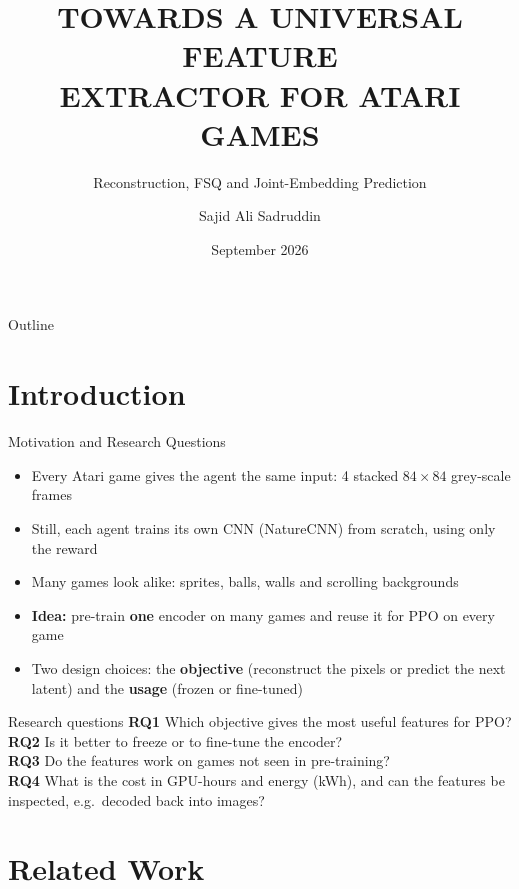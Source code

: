 \documentclass[aspectratio=43,10pt]{beamer}
\title[Universal Feature Extractor for Atari]{TOWARDS A UNIVERSAL FEATURE\\EXTRACTOR FOR ATARI GAMES}
\subtitle{Reconstruction, FSQ and Joint-Embedding Prediction}
\author{Sajid Ali Sadruddin}
\institute[Technische Universit\"at Dresden (TUD)]{Technische Universit\"at Dresden (TUD)}
\date{September 2026}
\begin{document}
\begin{frame}
  \titlepage
\end{frame}

\begin{frame}{Outline}
  \vfill
  \tableofcontents
  \vfill
\end{frame}

\section{Introduction}

\begin{frame}{Motivation and Research Questions}
  \begin{itemize}\small\setlength\itemsep{0.2em}
    \item Every Atari game gives the agent the same input: 4 stacked $84\times84$ grey-scale frames
    \item Still, each agent trains its own CNN (NatureCNN) from scratch, using only the reward
    \item Many games look alike: sprites, balls, walls and scrolling backgrounds
    \item \textbf{Idea:} pre-train \textbf{one} encoder on many games and reuse it for PPO on
          every game
    \item Two design choices: the \textbf{objective} (reconstruct the pixels or predict the next
          latent) and the \textbf{usage} (frozen or fine-tuned)
  \end{itemize}
  \vspace{0.1em}
  \begin{block}{Research questions}
    \small
    \textbf{RQ1} Which objective gives the most useful features for PPO?\\
    \textbf{RQ2} Is it better to freeze or to fine-tune the encoder?\\
    \textbf{RQ3} Do the features work on games not seen in pre-training?\\
    \textbf{RQ4} What is the cost in GPU-hours and energy (kWh), and can the features be\\
     inspected, e.g.\ decoded back into images?
  \end{block}
\end{frame}

\section{Related Work}
\end{document}
